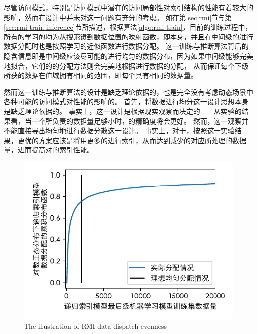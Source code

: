 尽管访问模式，特别是访问模式中潜在的访问局部性对索引结构的性能有着较大的影响，然而{\li}在设计中并未对这一问题有充分的考虑。
如在第\ref{sec:rmi}节与第\ref{sec:rmi-train-inference}节所描述，根据算法\ref{algo:rmi-train}，目前{\rmi}的训练过程中，
所有的{\model}学习的均为从搜索键到数据位置的映射函数，即{\cdf}本身，并且在中间级的{\model}进行数据分配时也是按照学习的{\cdf}近似函数进行数据分配。
这一训练与推断算法背后的隐含信息即是中间级{\model}应该尽可能的进行均匀的数据分布，因为如果中间级{\model}能够完美地拟合{\cdf}，它们的的分配方法则会完美地根据{\cdf}进行数据的分配，
从而保证每个下级{\model}所获的数据在{\cdf}值域拥有相同的范围，即每个{\model}具有相同的数据量。

然而这一{\rmi}训练与推断算法的设计是缺乏理论依据的，也是完全没有考虑动态场景中各种可能的访问模式对{\li}性能的影响的。
首先，将数据进行均分这一设计思想本身是缺乏理论依据的。
事实上，这一设计是根据现实观察而决定的{------}从实验的结果看，当一个{\model}所负责的数据量足够小时，{\model}的精确度将会更好。
然而，这一观察并不能直接导出均匀地进行数据分散这一设计。
事实上，对于{\skewacc}，按照这一实验结果，更优的方案应该是将{\hotkey}用更多的{\model}进行索引，从而达到减少{\hotkey}的对应{\model}所处理的数据量，进而提高对{\hotkey}的索引性能。

\begin{figure}[!htp]
  \centering
  \includegraphics{figure/dispatch.pdf}
    {The illustration of RMI data dispatch evenness}
  \label{fig:rmi-dispatch}
\end{figure}

